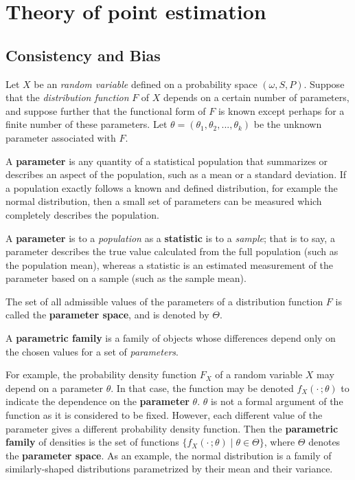 \documentclass{tufte-handout}
\begin{document}
\section{Theory of point estimation}
\subsection{Consistency and Bias}%
  \label{sub:Consistency and Bias}
  
\hspace{24pt}Let $X$ be an \textit{random variable} defined on a probability space $(\omega, S, P)$. Suppose that the \textit{distribution function} $F$ of $X$ depends on a certain number of parameters, and suppose further that the functional form of $F$ is known except perhaps for a finite number of these parameters. Let $\theta = (\theta_1, \theta_2 , . . . , \theta_k)$ be the unknown parameter associated with $F$.
\begin{definition}[Parameter]
  A \textbf{parameter} is any quantity of a statistical population that summarizes or describes an aspect of the population, such as a mean or a standard deviation. If a population exactly follows a known and defined distribution, for example the normal distribution, then a small set of parameters can be measured which completely describes the population. 

  A \textbf{parameter} is to a \textit{population} as a \textbf{statistic} is to a \textit{sample}; that is to say, a parameter describes the true value calculated from the full population (such as the population mean), whereas a statistic is an estimated measurement of the parameter based on a sample (such as the sample mean).
\end{definition}
\begin{definition}
  The set of all admissible values of the parameters of a distribution function $F$ is
  called the \textbf{parameter space}, and is denoted by $\Theta $.
\end{definition}
\begin{definition}
  A \textbf{parametric family} is a family of objects whose differences depend only on the chosen values for a set of \textit{parameters}.
\end{definition}
\begin{example}[]
  For example, the probability density function $F_X$ of a random variable $X$ may depend on a parameter $\theta$. In that case, the function may be denoted 
  ${f_{X}(\cdot \,;\theta )}$ to indicate the dependence on the \textbf{parameter} $\theta$. $\theta$ is not a formal argument of the function as it is considered to be fixed. However, each different value of the parameter gives a different probability density function. Then the \textbf{parametric family} of densities is the set of functions ${\{f_{X}(\cdot \,;\theta )\mid \theta \in \Theta \}}$, where $\Theta$ denotes the \textbf{parameter space}. As an example, the normal distribution is a family of similarly-shaped distributions parametrized by their mean and their variance.
\end{example}
\end{document}
